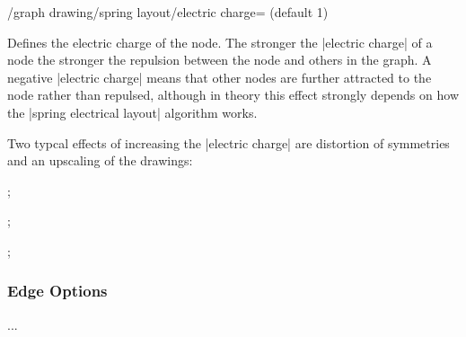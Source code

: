 \begin{key}{/graph drawing/spring layout/electric charge= 
  (default 1)}

  Defines the electric charge of the node. The stronger the 
  |electric charge| of a node the stronger the repulsion between the
  node and others in the graph. A negative |electric charge| means that
  other nodes are further attracted to the node rather than repulsed,
  although in theory this effect strongly depends on how the 
  |spring electrical layout| algorithm works.

  Two typcal effects of increasing the |electric charge| are distortion
  of symmetries and an upscaling of the drawings:
  \begin{codeexample}[width=5cm] 
\tikz {};

\tikz {};

\tikz {};
  \end{codeexample}
\end{key}

\subsubsection{Edge Options}

...

\endinput

